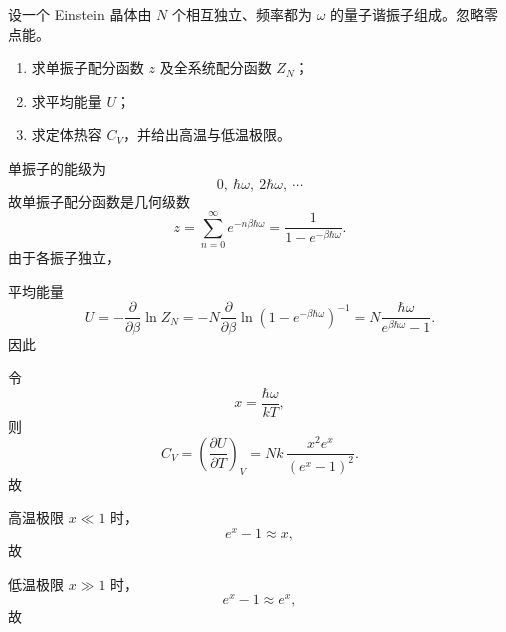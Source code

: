 \begin{question}[16分]
设一个 Einstein 晶体由 $N$ 个相互独立、频率都为 $\omega$ 的量子谐振子组成。忽略零点能。
\begin{enumerate}[label=（\arabic*）,leftmargin=2.8em,itemsep=0.2em]
\item 求单振子配分函数 $z$ 及全系统配分函数 $Z_N$；
\item 求平均能量 $U$；
\item 求定体热容 $C_V$，并给出高温与低温极限。
\end{enumerate}
\begin{solution}

单振子的能级为
\[
0,\ \hbar\omega,\ 2\hbar\omega,\ \cdots
\]
故单振子配分函数是几何级数
\[
z=\sum_{n=0}^{\infty}e^{-n\beta\hbar\omega}
=\frac{1}{1-e^{-\beta\hbar\omega}}.
\]
由于各振子独立，

平均能量
\[
U=-\frac{\partial}{\partial\beta}\ln Z_N
=-N\frac{\partial}{\partial\beta}\ln\left(1-e^{-\beta\hbar\omega}\right)^{-1}
= N\frac{\hbar\omega}{e^{\beta\hbar\omega}-1}.
\]
因此

令
\[
x=\frac{\hbar\omega}{kT},
\]
则
\[
C_V=\left(\frac{\partial U}{\partial T}\right)_V
=Nk\,\frac{x^2e^x}{(e^x-1)^2}.
\]
故

高温极限 $x\ll1$ 时，
\[
e^x-1\approx x,
\]
故

低温极限 $x\gg1$ 时，
\[
e^x-1\approx e^x,
\]
故
\end{solution}
\end{question}

